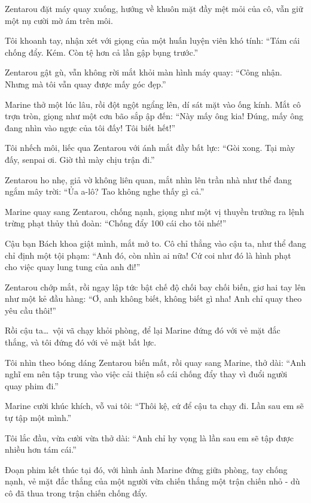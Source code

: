 \documentclass[../main.tex]{subfiles}
\begin{document}
Zentarou đặt máy quay xuống, hướng về khuôn mặt đầy mệt mỏi của cô, vẫn giữ một nụ cười mờ ám trên môi.


Tôi khoanh tay, nhận xét với giọng của một huấn luyện viên khó tính: ``Tám cái chống đẩy. Kém. Còn tệ hơn cả lần gập bụng trước.''

Zentarou gật gù, vẫn không rời mắt khỏi màn hình máy quay: ``Công nhận. Nhưng mà tôi vẫn quay được mấy góc đẹp.''

Marine thở một lúc lâu, rồi đột ngột ngẩng lên, dí sát mặt vào ống kính. Mắt cô trợn tròn, giọng như một cơn bão sắp ập đến: ``Này mấy ông kia! Đúng, mấy ông đang nhìn vào ngực của tôi đấy! Tôi biết hết!''


Tôi nhếch môi, liếc qua Zentarou với ánh mắt đầy bất lực: ``Gòi xong. Tại mày đấy, senpai ơi. Giờ thì mày chịu trận đi.''

Zentarou ho nhẹ, giả vờ không liên quan, mắt nhìn lên trần nhà như thể đang ngắm mây trời: ``Ủa a-lô? Tao không nghe thấy gì cả.''

Marine quay sang Zentarou, chống nạnh, giọng như một vị thuyền trưởng ra lệnh trừng phạt thủy thủ đoàn: ``Chống đẩy 100 cái cho tôi nhé!''

Cậu bạn Bách khoa giật mình, mắt mở to. Cô chỉ thẳng vào cậu ta, như thể đang chỉ định một tội phạm: ``Anh đó, còn nhìn ai nữa! Cứ coi như đó là hình phạt cho việc quay lung tung của anh đi!''

Zentarou chớp mắt, rồi ngay lập tức bật chế độ chối bay chối biến, giơ hai tay lên như một kẻ đầu hàng: ``Ơ, anh không biết, không biết gì nha! Anh chỉ quay theo yêu cầu thôi!''

Rồi cậu ta\dots\ vội vã chạy khỏi phòng, để lại Marine đứng đó với vẻ mặt đắc thắng, và tôi đứng đó với vẻ mặt bất lực.

Tôi nhìn theo bóng dáng Zentarou biến mất, rồi quay sang Marine, thở dài: ``Anh nghĩ em nên tập trung vào việc cải thiện số cái chống đẩy thay vì đuổi người quay phim đi.''

Marine cười khúc khích, vỗ vai tôi: ``Thôi kệ, cứ để cậu ta chạy đi. Lần sau em sẽ tự tập một mình.''

Tôi lắc đầu, vừa cười vừa thở dài: ``Anh chỉ hy vọng là lần sau em sẽ tập được nhiều hơn tám cái.''

Đoạn phim kết thúc tại đó, với hình ảnh Marine đứng giữa phòng, tay chống nạnh, vẻ mặt đắc thắng của một người vừa chiến thắng một trận chiến nhỏ - dù cô đã thua trong trận chiến chống đẩy.
\end{document}
